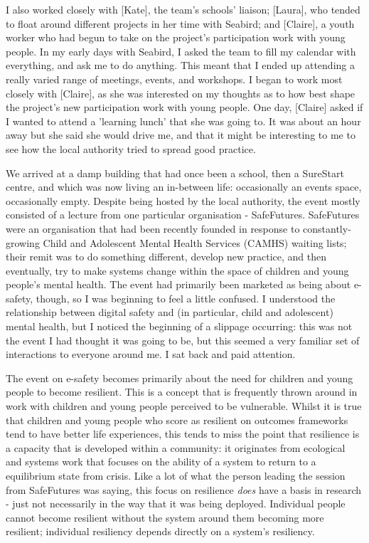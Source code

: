 I also worked closely with [Kate], the team's schools' liaison; [Laura], who tended to float around different projects in her time with Seabird; and [Claire], a youth worker who had begun to take on the project's participation work with young people. In my early days with Seabird, I asked the team to fill my calendar with everything, and ask me to do anything. This meant that I ended up attending a really varied range of meetings, events, and workshops. I began to work most closely with [Claire], as she was interested on my thoughts as to how best shape the project's new participation work with young people. One day, [Claire] asked if I wanted to attend a 'learning lunch' that she was going to. It was about an hour away but she said she would drive me, and that it might be interesting to me to see how the local authority tried to spread good practice.  

We arrived at a damp building that had once been a school, then a SureStart centre, and which was now living an in-between life: occasionally an events space, occasionally empty. Despite being hosted by the local authority, the event mostly consisted of a lecture from one particular organisation - SafeFutures. SafeFutures were an organisation that had been recently founded in response to constantly-growing Child and Adolescent Mental Health Services (CAMHS) waiting lists; their remit was to do something different, develop new practice, and then eventually, try to make systems change within the space of children and young people's mental health. The event had primarily been marketed as being about e-safety, though, so I was beginning to feel a little confused. I understood the relationship between digital safety and (in particular, child and adolescent) mental health, but I noticed the beginning of a slippage occurring: this was not the event I had thought it was going to be, but this seemed a very familiar set of interactions to everyone around me. I sat back and paid attention. 

The event on e-safety becomes primarily about the need for children and young people to become resilient. This is a concept that is frequently thrown around in work with children and young people perceived to be vulnerable. Whilst it is true that children and young people who score as resilient on outcomes frameworks tend to have better life experiences, this tends to miss the point that resilience is a capacity that is developed within a community: it originates from ecological and systems work that focuses on the ability of a system to return to a equilibrium state from crisis. 
Like a lot of what the person leading the session from SafeFutures was saying, this focus on resilience \textit{does} have a basis in research - just not necessarily in the way that it was being deployed. Individual people cannot become resilient without the system around them becoming more resilient; individual resiliency depends directly on a system's resiliency. 

